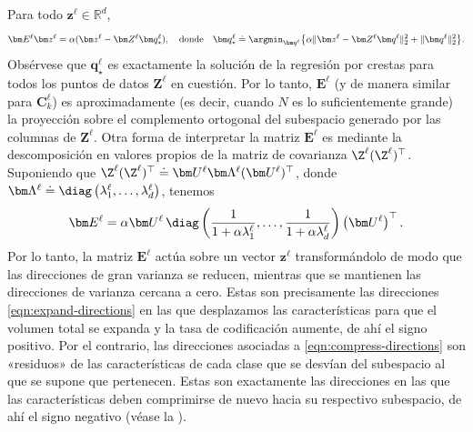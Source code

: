 \documentclass[../../book-main.tex]{subfiles}
\begin{document}
\begin{remark}\label{rem:regression-interpretation}
    Para todo $\bm z^\ell \in \mathbb{R}^d$,
    \begin{gather}
        \scalebox{0.95}{\(\displaystyle\bm E^\ell \bm z^\ell =
                \alpha(\bm z^\ell - \bm Z^\ell \bm
                q^\ell_\star), \quad
                \mbox{donde} \quad \bm q^\ell_\star \doteq \argmin_{\bm
                q^\ell} \big\{\alpha \|\bm z^\ell - \bm Z^\ell \bm
        q^\ell\|_2^2 + \|\bm q^\ell\|_2^2\big\}.\)}
    \end{gather}
    Obsérvese que $\bm q^\ell_\star$ es exactamente la solución de la
    regresión por crestas para todos los puntos de datos $\bm Z^\ell$ en cuestión.
    Por lo tanto, $\bm E^\ell$ (y de manera similar para $\bm C^\ell_k$) es
    aproximadamente (es decir, cuando $N$ es lo suficientemente grande) la proyección
    sobre el complemento ortogonal del subespacio generado por las columnas
    de $\bm Z^\ell$. Otra forma de interpretar la matriz $\bm E^\ell$
    es mediante la descomposición en valores propios de la matriz de covarianza
    $\Z^\ell (\Z^\ell)^\top$. Suponiendo que $\Z^\ell (\Z^\ell)^\top
    \doteq \bm U^\ell \bm \Lambda^\ell (\bm U^\ell)^\top$, donde $\bm
    \Lambda^\ell \doteq \diag\left(\lambda^\ell_1, \ldots,
    \lambda^\ell_d \right)$, tenemos
    \begin{equation}
        \bm E^\ell = \alpha \bm U^\ell\,
        \diag\left(\frac{1}{1+\alpha\lambda^\ell_1}, \ldots,
        \frac{1}{1+\alpha\lambda^\ell_d}\right) \left(\bm U^\ell\right)^\top.
    \end{equation}
    Por lo tanto, la matriz $\bm E^\ell$ actúa sobre un vector $\bm
    z^\ell$ transformándolo de modo que las direcciones de gran varianza
    se reducen, mientras que se mantienen las direcciones de varianza cercana a cero. Estas
    son precisamente las direcciones \eqref{eqn:expand-directions} en las que
    desplazamos las características para que el volumen total se expanda y la
    tasa de codificación aumente, de ahí el signo positivo. Por el
    contrario, las direcciones asociadas a
    \eqref{eqn:compress-directions} son «residuos» de las características de
    cada clase que se desvían del subespacio al que se
    supone que pertenecen. Estas son exactamente las direcciones en las que las
    características deben comprimirse de nuevo hacia su respectivo
    subespacio, de ahí el signo negativo (véase la
    ).


\end{remark}
\end{document}
